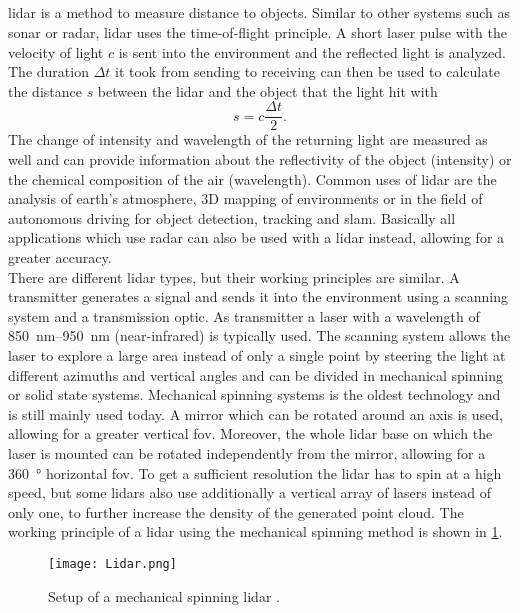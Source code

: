\subsection{}
\gls{lidar} is a method to measure distance to objects.
Similar to other systems such as \gls{sonar} or \gls{radar}, \gls{lidar} uses the time-of-flight principle.
A short laser pulse with the velocity of light $c$ is sent into the environment and the reflected light is analyzed.
The duration $\Delta t$ it took from sending to receiving can then be used to calculate the distance $s$ between the \gls{lidar} and the object that the light hit with
\begin{equation}
	s = c\frac{\Delta t}{2}.
\end{equation}
The change of intensity and wavelength of the returning light are measured as well and can provide information about the reflectivity of the object (intensity) or the chemical composition of the air (wavelength).
Common uses of \gls{lidar} are the analysis of earth's atmosphere, 3D mapping of environments or in the field of autonomous driving for object detection, tracking and \gls{slam}.
Basically all applications which use \gls{radar} can also be used with a \gls{lidar} instead, allowing for a greater accuracy.\\
There are different \gls{lidar} types, but their working principles are similar.
A transmitter generates a signal and sends it into the environment using a scanning system and a transmission optic.
As transmitter a laser with a wavelength of \SIrange{850}{950}{\nano\metre} (near-infrared) is typically used.
The scanning system allows the laser to explore a large area instead of only a single point by steering the light at different azimuths and vertical angles and can be divided in mechanical spinning or solid state systems.
Mechanical spinning systems is the oldest technology and is still mainly used today.
A mirror which can be rotated around an axis is used, allowing for a greater vertical \gls{fov}.
Moreover, the whole \gls{lidar} base on which the laser is mounted can be rotated independently from the mirror, allowing for a \SI{360}{\degree} horizontal \gls{fov}.
To get a sufficient resolution the \gls{lidar} has to spin at a high speed, but some \glspl{lidar} also use additionally a vertical array of lasers instead of only one, to further increase the density of the generated point cloud.
The working principle of a \gls{lidar} using the mechanical spinning method is shown in \cref{fig:lidar}.
\begin{figure}[htb]
	\centering
	\texttt{[image: Lidar.png]}
	\caption[Setup of a mechanical spinning \acrshort{lidar}]{Setup of a mechanical spinning \acrshort{lidar} \cite{Li2020}.}
	\label{fig:lidar}
\end{figure}
